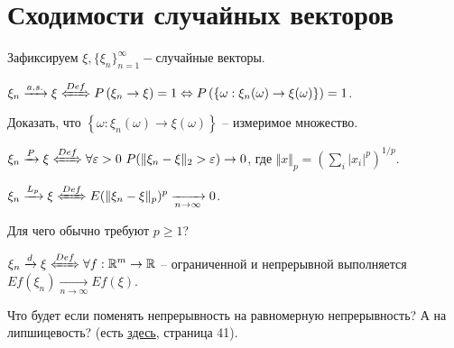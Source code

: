 \section{Сходимости случайных векторов}

Зафиксируем $\displaystyle \xi ,\{\xi _{n}\}_{n=1}^{\infty } -$случайные векторы.

\begin{definition}
	$\displaystyle \xi _{n}\xrightarrow{a.s.} \xi \xLeftrightarrow{Def} P\left( \xi _{n}\rightarrow \xi \right) =1\Leftrightarrow P\left(\left\{\omega :\xi _{n}( \omega )\rightarrow \xi ( \omega )\right\}\right) = 1$.
\end{definition}

\begin{exercise}
	Доказать, что $\displaystyle \left\{\omega :\xi _{n}( \omega )\rightarrow \xi ( \omega )\right\}$ -- измеримое множество.
\end{exercise}

\begin{definition}
	$\displaystyle \xi _{n}\xrightarrow{P} \xi \xLeftrightarrow{Def} \forall \varepsilon  >0\ P(\Vert \xi _{n} -\xi \Vert _{2}  >\varepsilon )\rightarrow 0$, где $\displaystyle \Vert x\Vert _{p} =\left(\sum _{i}| x_{i}| ^{p}\right)^{1/p}$.
\end{definition}

\begin{definition}
	$\displaystyle \xi _{n}\xrightarrow{L_{p}} \xi \xLeftrightarrow{Def} E(\Vert \xi _{n} -\xi \Vert _{p})^{p}\xrightarrow[n\rightarrow \infty ]{} 0$.
\end{definition}

\begin{exercise}
	Для чего обычно требуют $\displaystyle p\geqslant 1$?
\end{exercise}

\begin{definition}
	$\displaystyle \xi _{n}\xrightarrow{d} \xi \xLeftrightarrow{Def} \forall f:\mathbb{R}^{m}\rightarrow \mathbb{R}$ -- ограниченной и непрерывной выполняется $\displaystyle Ef( \xi _{n})\xrightarrow[n\rightarrow \infty ]{} Ef( \xi )$.
\end{definition}

\begin{exercise}
	Что будет если поменять непрерывность на равномерную непрерывность? А на липшицевость? (есть \href{https://arxiv.org/pdf/1610.05415.pdf}{здесь}, страница 41).
\end{exercise}

